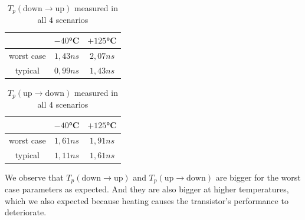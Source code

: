 \documentclass[../main.tex]{subfiles}
\begin{document}
{		\begin{table}[htbp]
			\centering
			\renewcommand{\arraystretch}{1.5} %
			\begin{tabular}{|c|c|c|}
				\hline
				 & $-40$°C & $+125$°C \\ \hline
				worst case & $1,43ns$ & $2,07ns$  \\ \hline
				typical & $0,99ns$ & $1,43ns$  \\ \hline
			\end{tabular}
			\caption{$T_p(\text{down} \to \text{up})$ measured in all $4$ scenarios}
			\label{tab:8a}
		\end{table}
			
		\begin{table}[htbp]
			\centering
			\renewcommand{\arraystretch}{1.5} %
			\begin{tabular}{|c|c|c|}
				\hline
				& $-40$°C & $+125$°C \\ \hline
				worst case & $1,61ns$ & $1,91ns$  \\ \hline
				typical & $1,11ns$ & $1,61ns$  \\ \hline
			\end{tabular}
			\caption{$T_p(\text{up} \to \text{down})$ measured in all $4$ scenarios}
			\label{tab:8b}
		\end{table}
		
		We observe that $T_p(\text{down} \to \text{up})$ and $T_p(\text{up} \to \text{down})$ are bigger for the worst case parameters as expected. And they are also bigger at higher temperatures, which we also expected because heating causes the transistor's performance to deteriorate.
		
	}
\end{document}
